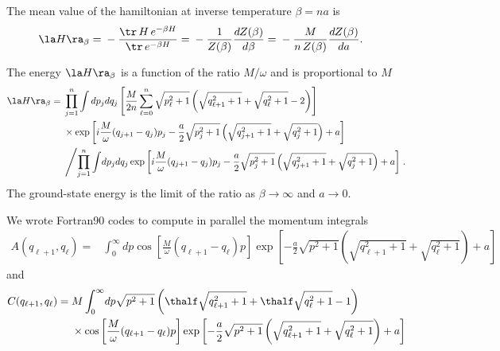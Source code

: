 \documentclass[prd,preprint,floatfix,showpacs]{revtex4-1}
\begin{document}
The mean value of the hamiltonian 
at inverse temperature \( \beta = n a \) is
\begin{equation} 
   \begin{split}
\la H \ra_\beta ={}& - \frac{\tr \, H \, e^{- \beta H}} {\tr \, e^{- \beta H}}  
= {} - \frac{1}{Z(\beta)} \frac{d Z(\beta)}{d \beta}
= {} - \frac{M}{n \, Z(\beta)} \frac{d Z(\beta)}{d a} .
\label {mean value of the hamiltonian }
   \end{split}
\end{equation}
\par
The energy \( \la H \ra_\beta \)
is a function of the ratio \( M/\omega \)
and is proportional to \( M \) 
\begin{equation} 
   \begin{split}
\la H \ra_\beta= {}& 
\prod_{j=1}^n \int dp_j dq_j 
\left[ \frac{M}{2n}\sum_{\ell=0}^n  
\sqrt{p^2_\ell + 1}
\left(\sqrt{q^2_{\ell+1} + 1} +
\sqrt{ q^2_\ell + 1} - 2\right)
\right]
\\
{}& \times 
\exp \left[ 
 i \frac{M}{\omega} (q_{j+1} - q_j) p_j 
- \frac{a}{2} \sqrt{p^2_j + 1}
\left( \sqrt{q^2_{j+1} + 1}
+ \sqrt{q^2_j + 1} \right) + a  
 \right]
 \\
 {}& \left/
\prod_{j=1}^n \int \! dp_j dq_j
\exp \left[ i \frac{M}{\omega} (q_{j+1} - q_j) p_j 
- \frac{a}{2} \sqrt{p^2_j + 1}
\left( \sqrt{q^2_{j+1} + 1}
+ \sqrt{q^2_j + 1} \right) + a
 \right] \right. .
 \label {B-I partition function}
   \end{split}
\end{equation}
The ground-state energy is the limit 
of the ratio as \( \beta \to \infty \)
and \( a \to 0 \)\@.
\par
We wrote Fortran90 codes to compute
in parallel the momentum integrals
\begin{equation}
   \begin{split}
A(q_{\ell+1}, q_\ell) ={}& 
\int_0^\infty \! dp 
\cos \left[ \frac{M}{\omega}(q_{\ell+1} - q_\ell) p \right]
\exp \left[   
 - \frac{a}{2} \sqrt{p^2 + 1} 
 \left( \sqrt{ q^2_{\ell+1} + 1} +
\sqrt{ q^2_\ell + 1} \right) + a
 \right]
\label {Our first numerical integral is}
   \end{split}
\end{equation}
and
\begin{equation}
   \begin{split}
      C(q_{\ell+1}, q_\ell) = {}&
     M \int_0^\infty \! dp \sqrt{p^2 + 1}
\left(\thalf \sqrt{ q^2_{\ell+1} + 1 } +
\thalf \sqrt{q^2_\ell + 1} - 1 \right)
\\ 
{}& \times      
\cos \left[ \frac{M}{\omega}(q_{\ell+1} - q_\ell) p \right]
\exp \left[   
 - \frac{a}{2} \sqrt{p^2 + 1} 
 \left( \sqrt{ q^2_{\ell+1} + 1} +
\sqrt{ q^2_\ell + 1} \right) + a
 \right]
\label {Our second numerical integral is}
         \end{split}
\end{equation}
\end{document}

